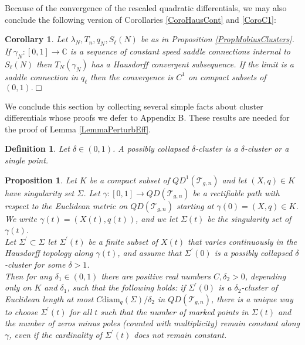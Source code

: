 \documentclass[12pt]{article}
\newtheorem{proposition}[theorem]{Proposition}
\newtheorem{corollary}[theorem]{Corollary}
\newtheorem{definition}[theorem]{Definition}
\newcommand{\cc}{\mathbb{C}}
\newcommand{\diam}{\mathrm{diam}}
\begin{document}
\noindent Because of the convergence of the rescaled quadratic differentials, we may also conclude the following version of Corollaries \ref{CoroHausCont} and \ref{CoroC1}:

\begin{corollary}\label{CoroC1forclusters}Let $\lambda_N,T_n,q_N,S_\ell(N)$ be as in Proposition \ref{PropMobiusClusters}. If $\gamma_N: [0,1] \to \cc$ is a sequence of constant speed saddle connections internal to $S_\ell(N)$ then $T_N(\gamma_N)$ has a Hausdorff convergent subsequence. If the limit is a saddle connection in $q_\ell$ then the convergence is $C^1$ on compact subsets of $(0,1). \Box$\end{corollary}

\noindent We conclude this section by collecting several simple facts about cluster differentials whose proofs we defer to Appendix B. These results are needed for the proof of Lemma \ref{LemmaPerturbEff}.

\begin{definition}Let $\delta \in (0,1)$. A \emph{possibly collapsed} $\delta$-cluster is a $\delta$-cluster or a single point.\end{definition}

\begin{proposition}\label{PropPersistentCluster} Let $K$ be a compact subset of $QD^1(\mathcal{T}_{g,n})$ and let $(X,q) \in K$ have singularity set $\Sigma$. Let $\gamma: [0,1] \to QD(\mathcal{T}_{g,n})$ be a rectifiable path with respect to the Euclidean metric on $QD(\mathcal{T}_{g,n})$ starting at $\gamma(0) = (X,q) \in K$. We write $\gamma(t) = (X(t),q(t))$, and we let $\Sigma(t)$ be the singularity set of $\gamma(t)$.\\

Let $\Sigma^\prime \subset \Sigma$ let $\Sigma^\prime(t)$ be a finite subset of $X(t)$ that varies continuously in the Hausdorff topology along $\gamma(t)$, and assume that $\Sigma^\prime(0)$ is a possibly collapsed $\delta$-cluster for some $\delta > 1$.\\

Then for any $\delta_1 \in (0,1)$ there are positive real numbers $C,\delta_2 > 0$, depending only on $K$ and $\delta_1$, such that the following holds: if $\Sigma^\prime(0)$ is a $\delta_2$-cluster of Euclidean length at most $C\diam_q(\Sigma)/\delta_2$ in $QD(\mathcal{T}_{g,n})$, there is a unique way to choose $\Sigma^\prime(t)$ for all $t$ such that the number of marked points in $\Sigma(t)$ and the number of zeros minus poles (counted with multiplicity) remain constant along $\gamma$, even if the cardinality of $\Sigma^\prime(t)$ does not remain constant. \end{proposition}
\end{document}
